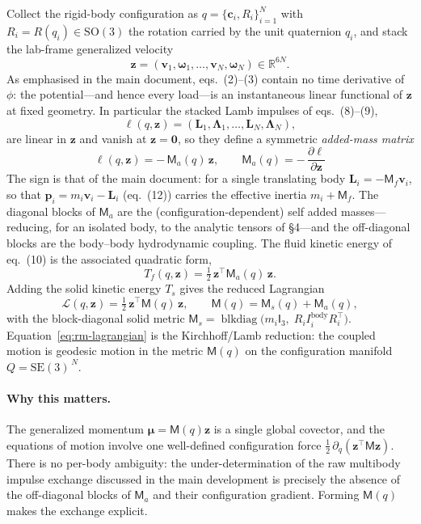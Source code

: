 \documentclass[11pt]{article}
\newcommand{\R}{\mathbb{R}}
\newcommand{\SEthree}{\mathrm{SE}(3)}
\newcommand{\Ma}{\mathsf{M}_{a}}
\newcommand{\Ms}{\mathsf{M}_{s}}
\newcommand{\Mmat}{\mathsf{M}}
\newcommand{\vv}{\mathbf{v}}
\newcommand{\ww}{\bm{\omega}}
\newcommand{\LL}{\mathbf{L}}
\newcommand{\LamL}{\bm{\Lambda}}
\newcommand{\zz}{\mathbf{z}}
\newcommand{\muv}{\bm{\mu}}
\newcommand{\half}{\tfrac12}
\begin{document}
Collect the rigid-body configuration as $q=\{\mathbf c_i,R_i\}_{i=1}^N$ with
$R_i=R(q_i)\in\mathrm{SO}(3)$ the rotation carried by the unit quaternion $q_i$,
and stack the lab-frame generalized velocity
\begin{equation}
\zz=(\vv_1,\ww_1,\dots,\vv_N,\ww_N)\in\R^{6N}.
\end{equation}
As emphasised in the main document, eqs.~(2)--(3) contain no time derivative of
$\phi$: the potential---and hence every load---is an instantaneous linear
functional of $\zz$ at fixed geometry. In particular the stacked Lamb impulses
of eqs.~(8)--(9),
\begin{equation}
\bm\ell(q,\zz)=(\LL_1,\LamL_1,\dots,\LL_N,\LamL_N),
\end{equation}
are linear in $\zz$ and vanish at $\zz=\mathbf 0$, so they define a symmetric
\emph{added-mass matrix}
\begin{equation}
\boxed{\;\bm\ell(q,\zz)=-\,\Ma(q)\,\zz,\qquad
\Ma(q)=-\,\frac{\partial\bm\ell}{\partial\zz}\;}
\label{eq:rm-Ma}
\end{equation}
The sign is that of the main document: for a single translating body
$\LL_i=-\mathsf M_{f}\vv_i$, so that $\mathbf p_i=m_i\vv_i-\LL_i$ (eq.~(12))
carries the effective inertia $m_i+\mathsf M_f$. The diagonal blocks of $\Ma$
are the (configuration-dependent) self added masses---reducing, for an isolated
body, to the analytic tensors of \S4---and the off-diagonal blocks are the
body--body hydrodynamic coupling. The fluid kinetic energy of eq.~(10) is the
associated quadratic form,
\begin{equation}
T_f(q,\zz)=\half\,\zz^{\!\top}\Ma(q)\,\zz .
\label{eq:rm-Tf}
\end{equation}
Adding the solid kinetic energy $T_s$ gives the reduced Lagrangian
\begin{equation}
\mathcal L(q,\zz)=\half\,\zz^{\!\top}\Mmat(q)\,\zz,\qquad
\Mmat(q)=\Ms(q)+\Ma(q),
\label{eq:rm-lagrangian}
\end{equation}
with the block-diagonal solid metric
$\Ms=\operatorname{blkdiag}\!\big(m_i\mathsf I_3,\;R_iI_i^{\mathrm{body}}R_i^\top\big)$.
Equation~\eqref{eq:rm-lagrangian} is the Kirchhoff/Lamb reduction: the coupled
motion is geodesic motion in the metric $\Mmat(q)$ on the configuration manifold
$Q=\SEthree^{\,N}$.

\paragraph{Why this matters.}
The generalized momentum $\muv=\Mmat(q)\zz$ is a single global covector, and the
equations of motion involve one well-defined configuration force
$\tfrac12\,\partial_q(\zz^\top\Mmat\zz)$. There is no per-body ambiguity: the
under-determination of the raw multibody impulse exchange discussed in the main
development is precisely the absence of the off-diagonal blocks of $\Ma$ and
their configuration gradient. Forming $\Mmat(q)$ makes the exchange explicit.
\end{document}
